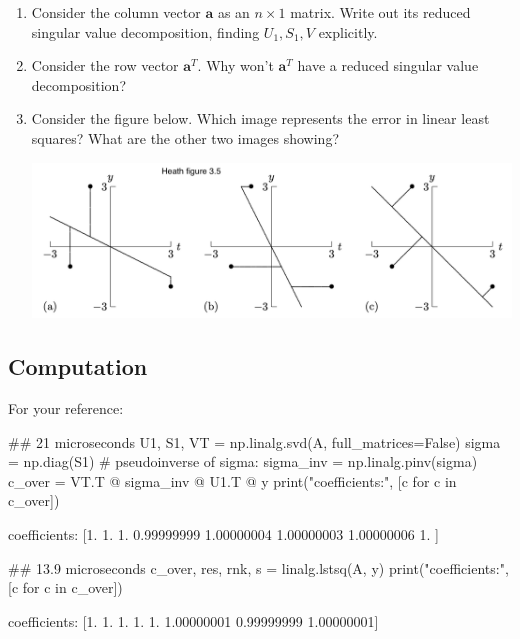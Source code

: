 \documentclass[12pt,letterpaper,noanswers]{exam}
\begin{document}
\begin{enumerate}[resume]
\itemsep50pt

\item Consider the column vector $\mathbf{a}$ as an $n\times 1$ matrix.  Write out its reduced singular value decomposition, finding $U_1, S_1, V$ explicitly.

\item Consider the row vector $\mathbf{a}^T$.  Why won't $\mathbf{a}^T$ have a reduced singular value decomposition?

\item Consider the figure below.  Which image represents the error in linear least squares?  What are the other two images showing?


\includegraphics[width=\textwidth]{AM111-F23-CourseNotes/img/leastsquares.png}
\end{enumerate}


\subsection{Computation}

For your reference:

\begin{pyin}
\## 21 microseconds
U1, S1, VT = np.linalg.svd(A, full_matrices=False)
sigma = np.diag(S1)
# pseudoinverse of sigma:
sigma_inv = np.linalg.pinv(sigma)
c_over = VT.T @ sigma_inv @ U1.T @ y
print("coefficients:", [c for c in c_over])
\end{pyin}
\begin{pyout}
coefficients: [1.         1.         1.         0.99999999 1.00000004 1.00000003 1.00000006 1.        ]
\end{pyout}

\begin{pyin}
\## 13.9 microseconds
c_over, res, rnk, s = linalg.lstsq(A, y)
print("coefficients:", [c for c in c_over])
\end{pyin}
\begin{pyout}
coefficients: [1.         1.         1.         1.         1.         1.00000001 0.99999999 1.00000001]
\end{pyout}
\end{document}
